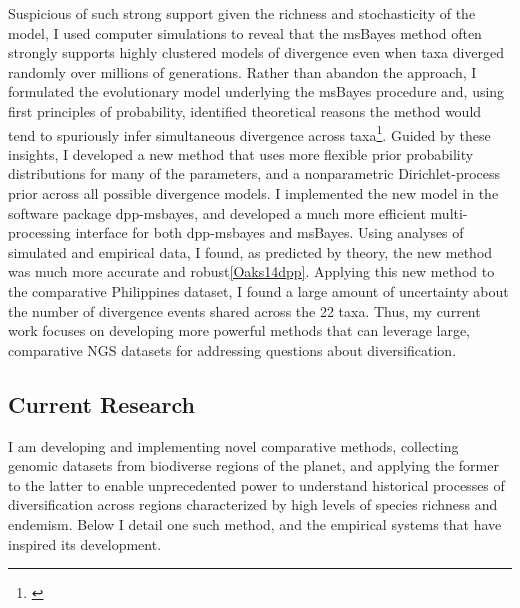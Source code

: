 Suspicious of such strong support given the richness and stochasticity of the
model, I used computer simulations to reveal that the msBayes method often
strongly supports highly clustered models of divergence even when taxa diverged
randomly over millions of generations.
Rather than abandon the approach, I formulated the evolutionary model
underlying the msBayes procedure and, using first principles of probability,
identified theoretical reasons the method would tend to spuriously infer
simultaneous divergence across
taxa\footnote{\label{Oaks12}}.
Guided by these insights, I developed a new method that uses more flexible
prior probability distributions for many of the parameters, and a nonparametric
Dirichlet-process prior across all possible divergence models.
I implemented the new model in the software package dpp-msbayes, and developed
a much more efficient multi-processing interface for both dpp-msbayes and
msBayes.
Using analyses of simulated and empirical data, I found, as predicted by
theory, the new method was much more accurate and robust\cref{Oaks14dpp}.
Applying this new method to the comparative Philippines dataset, I found a
large amount of uncertainty about the number of divergence events shared across
the 22 taxa.
Thus, my current work focuses on developing more powerful methods that can
leverage large, comparative NGS datasets for addressing questions about
diversification.


\subsection*{Current Research}
I am developing and implementing novel comparative methods, collecting genomic
datasets from biodiverse regions of the planet, and applying the former to the
latter to enable unprecedented power to understand historical processes of
diversification across regions characterized by high levels of species richness
and endemism.  Below I detail one such method, and the empirical systems that
have inspired its development.

